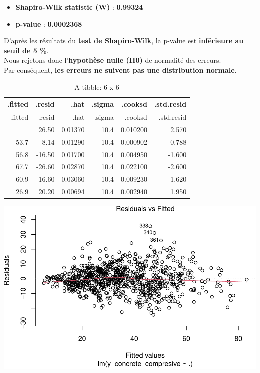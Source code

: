 \documentclass[
  12pt,
]{article}
\providecommand{\tightlist}{%
  \setlength{\itemsep}{0pt}\setlength{\parskip}{0pt}}
\begin{document}
\begin{itemize}
\tightlist
\item
  \textbf{Shapiro-Wilk statistic (W)} : \textbf{0.99324}\\
\item
  \textbf{p-value} : \textbf{0.0002368}
\end{itemize}

D'après les résultats du \textbf{test de Shapiro-Wilk}, la p-value est
\textbf{inférieure au seuil de 5 \%}.\\
Nous rejetons donc l'\textbf{hypothèse nulle (H0)} de normalité des
erreurs.\\
Par conséquent, \textbf{les erreurs ne suivent pas une distribution
normale}.

\begin{longtable}[]{@{}rrrrrr@{}}
\caption{A tibble: 6 x 6}\tabularnewline
\toprule\noalign{}
.fitted & .resid & .hat & .sigma & .cooksd & .std.resid \\
\midrule\noalign{}
\endfirsthead
\toprule\noalign{}
.fitted & .resid & .hat & .sigma & .cooksd & .std.resid \\
\midrule\noalign{}
\endhead
\bottomrule\noalign{}
\endlastfoot
53.5 & 26.50 & 0.01370 & 10.4 & 0.010200 & 2.570 \\
53.7 & 8.14 & 0.01290 & 10.4 & 0.000902 & 0.788 \\
56.8 & -16.50 & 0.01700 & 10.4 & 0.004950 & -1.600 \\
67.7 & -26.60 & 0.02870 & 10.4 & 0.022100 & -2.600 \\
60.9 & -16.60 & 0.03060 & 10.4 & 0.009230 & -1.620 \\
26.9 & 20.20 & 0.00694 & 10.4 & 0.002940 & 1.950 \\
\end{longtable}

\includegraphics{rmd_final_files/figure-latex/unnamed-chunk-42-1.pdf}
\end{document}
